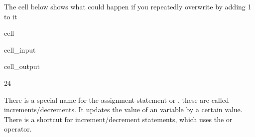 \documentclass[letterpaper,10pt,english]{jupyterBook}
\begin{document}
\sphinxAtStartPar
The cell below shows what could happen if you repeatedly overwrite  by adding 1 to it

\begin{sphinxuseclass}{cell}\begin{sphinxVerbatimInput}

\begin{sphinxuseclass}{cell_input}
\begin{sphinxVerbatim}[commandchars=\\\{\}]
    
    
    
\end{sphinxVerbatim}

\end{sphinxuseclass}\end{sphinxVerbatimInput}
\begin{sphinxVerbatimOutput}

\begin{sphinxuseclass}{cell_output}
\begin{sphinxVerbatim}[commandchars=\\\{\}]
24
\end{sphinxVerbatim}

\end{sphinxuseclass}\end{sphinxVerbatimOutput}

\end{sphinxuseclass}
\sphinxAtStartPar
There is a special name for the assignment statement  or , these are called increments/decrements. It updates the value of an  variable by a certain value. There is a shortcut for increment/decrement statements, which uses the \sphinxcode{\sphinxupquote{+=}} or \sphinxcode{\sphinxupquote{\sphinxhyphen{}=}} operator.
\end{document}
